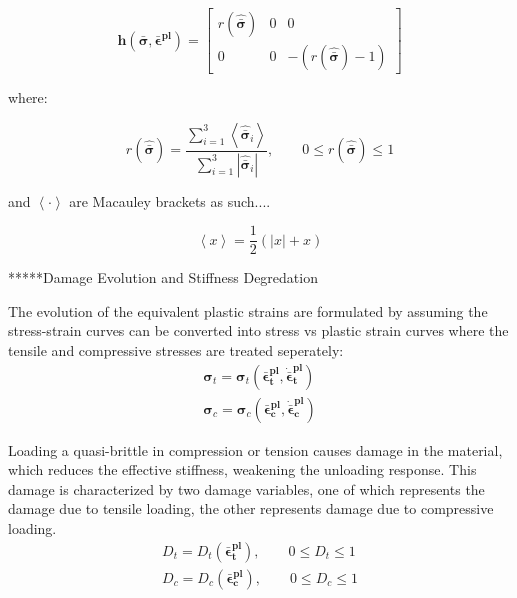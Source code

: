 \begin{equation}
\mathbf{h}\left(\boldsymbol{\bar{\sigma}},\boldsymbol{\bar{\epsilon}^{pl}}\right)=\left[\begin{array}{ccc}
r\left(\boldsymbol{\hat{\bar{\sigma}}}\right) & 0 & 0\\
0 & 0 & -\left(r\left(\boldsymbol{\hat{\bar{\sigma}}}\right)-1\right)
\end{array}\right]\label{eqn:const9-1}
\end{equation}

where:

\begin{equation}
r\left(\hat{\boldsymbol{\bar{\sigma}}}\right)=\frac{\sum_{i=1}^{3}\left\langle \hat{\boldsymbol{\bar{\sigma}}}_{i}\right\rangle }{\sum_{i=1}^{3}\left|\hat{\boldsymbol{\bar{\sigma}}}_{i}\right|},\qquad0\leq r\left(\hat{\boldsymbol{\bar{\sigma}}}\right)\leq1\label{eqn:const9-2}
\end{equation}


and $\left\langle \cdotp\right\rangle $ are Macauley brackets as
such....

\begin{equation}
\left\langle x\right\rangle =\frac{1}{2}\left(\left|x\right|+x\right)\label{eqn:const9-3}
\end{equation}


{*}{*}{*}{*}{*}Damage Evolution and Stiffness Degredation

The evolution of the equivalent plastic strains are formulated by
assuming the stress-strain curves can be converted into stress vs
plastic strain curves where the tensile and compressive stresses are
treated seperately: 
\begin{equation}
\begin{array}{c}
\boldsymbol{\sigma}_{t}=\boldsymbol{\sigma}_{t}\left(\boldsymbol{\bar{\epsilon}_{t}^{pl}},\boldsymbol{\dot{\bar{\epsilon}}_{t}^{pl}}\right)\\
\boldsymbol{\sigma}_{c}=\boldsymbol{\sigma}_{c}\left(\boldsymbol{\bar{\epsilon}_{c}^{pl}},\boldsymbol{\dot{\bar{\epsilon}}_{c}^{pl}}\right)
\end{array}
\label{eqn:dam1}
\end{equation}


Loading a quasi-brittle in compression or tension causes damage in
the material, which reduces the effective stiffness, weakening the
unloading response. This damage is characterized by two damage variables,
one of which represents the damage due to tensile loading, the other
represents damage due to compressive loading. 
\begin{equation}
\begin{array}{c}
D_{t}=D_{t}\left(\boldsymbol{\bar{\epsilon}_{t}^{pl}}\right),\qquad0\leq D_{t}\leq1\\
D_{c}=D_{c}\left(\boldsymbol{\bar{\epsilon}_{c}^{pl}}\right),\qquad0\leq D_{c}\leq1\end{array}
\label{eqn:dam2}
\end{equation}


